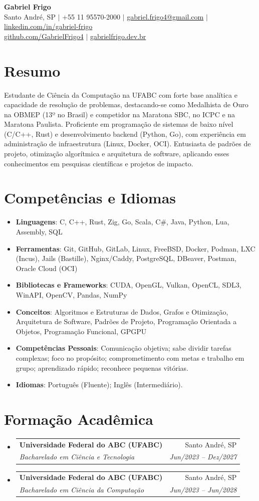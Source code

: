 \documentclass[letterpaper,10pt]{article}
\makeatletter
\newcommand{\resumeItem}[1]{\item\small{#1}}
\newcommand{\resumeSubheading}[4]{
\vspace{-1pt}\item
  \begin{tabular*}{0.97\textwidth}[t]{l@{\extracolsep{\fill}}r}
    \textbf{#1} & #2 \\
    \textit{#3} & \textit{#4} \\
  \end{tabular*}\vspace{-7pt}
}
\newcommand{\resumeSubHeadingList}{\begin{itemize}[leftmargin=0.15in, label={}]}
\newcommand{\resumeSubHeadingListEnd}{\end{itemize}}
\makeatother
\begin{document}
\begin{center}
  \textbf{\Huge Gabriel Frigo} \\
  \small Santo André, SP $|$ +55 11 95570-2000 $|$ \href{mailto:gabriel.frigo4@gmail.com}{gabriel.frigo4@gmail.com} $|$
  \href{https://linkedin.com/in/gabriel-frigo-b6727b275/}{linkedin.com/in/gabriel-frigo} \\
  \href{https://github.com/GabrielFrigo4}{github.com/GabrielFrigo4} $|$
  \href{https://gabrielfrigo.dev.br}{gabrielfrigo.dev.br}
\end{center}

\section{Resumo}
Estudante de Ciência da Computação na UFABC com forte base analítica e capacidade de resolução de problemas, destacando-se como Medalhista de Ouro na OBMEP (13º no Brasil) e competidor na Maratona SBC, no ICPC e na Maratona Paulista. Proficiente em programação de sistemas de baixo nível (C/C++, Rust) e desenvolvimento backend (Python, Go), com experiência em administração de infraestrutura (Linux, Docker, OCI). Entusiasta de padrões de projeto, otimização algorítmica e arquitetura de software, aplicando esses conhecimentos em pesquisas científicas e projetos de impacto.

\section{Competências e Idiomas}
\resumeSubHeadingList
  \resumeItem{\textbf{Linguagens}: C, C++, Rust, Zig, Go, Scala, C\#, Java, Python, Lua, Assembly, SQL}
  \resumeItem{\textbf{Ferramentas}: Git, GitHub, GitLab, Linux, FreeBSD, Docker, Podman, LXC (Incus), Jails (Bastille), Nginx/Caddy, PostgreSQL, DBeaver, Postman, Oracle Cloud (OCI)}
  \resumeItem{\textbf{Bibliotecas e Frameworks}: CUDA, OpenGL, Vulkan, OpenCL, SDL3, WinAPI, OpenCV, Pandas, NumPy}
  \resumeItem{\textbf{Conceitos}: Algoritmos e Estruturas de Dados, Grafos e Otimização, Arquitetura de Software, Padrões de Projeto, Programação Orientada a Objetos, Programação Funcional, GPGPU}
  \resumeItem{\textbf{Competências Pessoais}: Comunicação objetiva; sabe dividir tarefas complexas; foco no propósito; comprometimento com metas e trabalho em grupo; aprendizado rápido; reconhece pequenas vitórias.}
  \resumeItem{\textbf{Idiomas}: Português (Fluente); Inglês (Intermediário).}
\resumeSubHeadingListEnd

\section{Formação Acadêmica}
\resumeSubHeadingList
  \resumeSubheading
    {Universidade Federal do ABC (UFABC)}{Santo André, SP}
    {Bacharelado em Ciência e Tecnologia}{Jun/2023 -- Dez/2027}
  \resumeSubheading
    {Universidade Federal do ABC (UFABC)}{Santo André, SP}
    {Bacharelado em Ciência da Computação}{Jun/2023 -- Jun/2028}
\resumeSubHeadingListEnd
\end{document}
